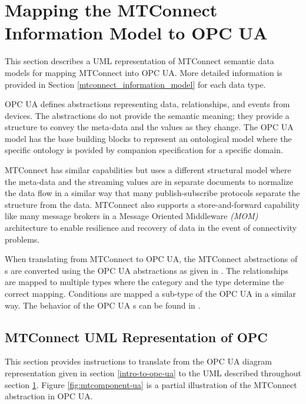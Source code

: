 \clearpage
\section{Mapping the MTConnect Information Model to OPC UA} 
\label{mtconnect-mapping}

This section describes a UML representation of MTConnect semantic data models for mapping MTConnect into OPC UA. More detailed information is provided in Section \ref{mtconnect_information_model} for each data type.

OPC UA defines abstractions representing data, relationships, and events from devices. The abstractions do not provide the semantic meaning; they provide a structure to convey the meta-data and the values as they change. The OPC UA model has the base building blocks to represent an ontological model where the specific ontology is povided by companion specification for a specific domain.

MTConnect has similar capabilities but uses a different structural model where the meta-data and the streaming values are in separate documents to normalize the data flow in a similar way that many publish-subscribe protocols separate the structure from the data. MTConnect also supports a store-and-forward capability like many message brokers in a Message Oriented Middleware \textit{(MOM)} architecture to enable resilience and recovery of data in the event of connectivity problems.

When translating from MTConnect to OPC UA, the MTConnect abstractions of s are converted using the OPC UA   abstractions as given in \cite{UAPart8}.  The relationships are mapped to multiple  types where the category and the type determine the correct mapping. Conditions are mapped a sub-type of the OPC UA  in a similar way. The behavior of the OPC UA s can be found in \cite{UAPart9}.

\subsection{MTConnect UML Representation of OPC}

This section provides instructions to translate from the OPC UA diagram representation given in section \ref{intro-to-opc-ua} to the UML described throughout section \ref{mtconnect-mapping}. Figure \ref{fig:mtcomponent-ua} is a partial illustration of the MTConnect  abstraction in OPC UA.

